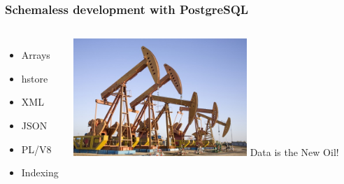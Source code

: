 \documentclass{beamer}
\begin{document}

\begin{frame}[fragile]
  \frametitle{Schemaless development with PostgreSQL}

  \vfill

\begin{columns}[c]

  \begin{itemize}
  \item Arrays
  \item hstore
  \item XML
  \item JSON
  \item PL/V8
  \item Indexing
  \end{itemize}  

\begin{center}
  \includegraphics[height=12em]{Data-is-the-new-oil-Concentra.jpg}
  \linebreak
  Data is the New Oil!
\end{center}
\end{columns}
\end{frame}
\end{document}
